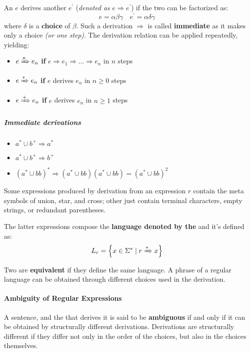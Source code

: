 \documentclass[english]{article}
\begin{document}
An \re \(e\) derives another \re \(e^\prime\) (\textit{denoted as \(e \Rightarrow e^\prime\)}) if the two \re can be factorized as:
\[ e = \alpha\beta\gamma \quad e^\prime = \alpha\delta\gamma \]
where \(\delta\) is a \textbf{choice} of \(\beta\).
Such a derivation \(\Rightarrow\) is called \textbf{immediate} as it makes only a choice \textit{(or one step)}.
The derivation relation can be applied repeatedly, yielding:

\begin{itemize}
  \item \(e \xRightarrow{n} e_n\) \textbf{if} \(e \Rightarrow e_1 \Rightarrow \ldots \Rightarrow e_n\) in \(n\) steps
  \item \(e \xRightarrow{\ast} e_n\) \textbf{if} \(e\) derives \(e_n\) in \(n \geq 0\) steps
  \item \(e \xRightarrow{+} e_n\) \textbf{if} \(e\) derives \(e_n\) in \(n \geq 1\) steps
\end{itemize}

\subparagraph*{Immediate derivations}

\begin{itemize}
  \item \(a^\ast \cup b^+ \Rightarrow a^\ast\)
  \item \(a^\ast \cup b^+ \Rightarrow b^+\)
  \item \(\left(a^\ast \cup b b\right)^\ast \Rightarrow \left(a^\ast \cup bb\right) \left(a^\ast \cup bb\right) = \left(a^\ast \cup bb \right)^2\)
\end{itemize}

\bigskip
Some expressions produced by derivation from an expression \(r\) contain the meta symbols of union, star, and cross;
other just contain terminal characters, empty strings, or redundant parentheses.

The latter expressions compose the \textbf{language denoted by the \re} and it's defined as:
\[L_r = \left\{x \in \Sigma^\ast \mid r \xRightarrow{\ast} x \right\}\]

Two \re are \textbf{equivalent} if they define the same language.
A phrase of a regular language can be obtained through different choices used in the derivation.

\paragraph{Ambiguity of Regular Expressions}

A sentence, and the \re that derives it is said to be \textbf{ambiguous} if and only if it can be obtained by structurally different derivations.
Derivations are structurally different if they differ not only in the order of the choices, but also in the choices themselves.
\end{document}
